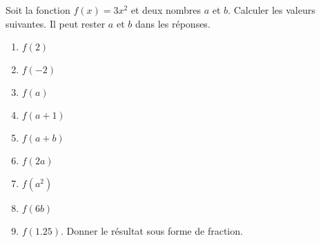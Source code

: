 
\begin{exercice}\label{exosmath-0013}

    Soit la fonction \( f(x)=3x^2\) et deux nombres \( a\) et \( b\). Calculer les valeurs suivantes. Il peut rester \( a\) et \( b\) dans les réponses.
    \begin{multicols}{3}
        \begin{enumerate}
            \item
                \( f(2)\) 
            \item
                \( f(-2)\)
            \item
                \( f(a)\)
            \item
                \( f(a+1)\)
            \item
                \( f(a+b)\)
            \item
                \( f(2a)\)
            \item
                \( f(a^2)\)
            \item
                \( f(6b)\)
            \item
                \( f(1.25)\). Donner le résultat sous forme de fraction.
        \end{enumerate}
    \end{multicols}

\end{exercice}
